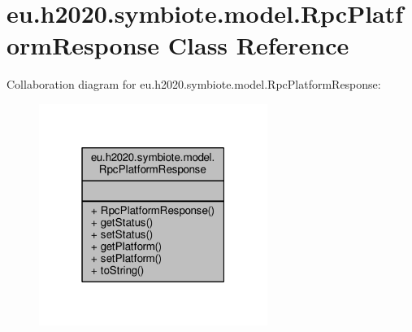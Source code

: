 \hypertarget{classeu_1_1h2020_1_1symbiote_1_1model_1_1RpcPlatformResponse}{}\section{eu.\+h2020.\+symbiote.\+model.\+Rpc\+Platform\+Response Class Reference}
\label{classeu_1_1h2020_1_1symbiote_1_1model_1_1RpcPlatformResponse}


Collaboration diagram for eu.\+h2020.\+symbiote.\+model.\+Rpc\+Platform\+Response\+:
\nopagebreak
\begin{figure}[H]
\begin{center}
\leavevmode
\includegraphics[width=211pt]{classeu_1_1h2020_1_1symbiote_1_1model_1_1RpcPlatformResponse__coll__graph}
\end{center}
\end{figure}
